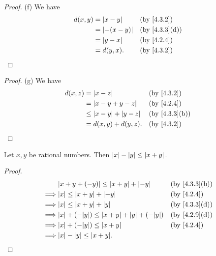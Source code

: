 \begin{proof}{(f)}
  We have
  \begin{align*}
    d(x, y) & = \abs{x - y}    &  & \by{4.3.2}                  \\
            & = \abs{-(x - y)} &  & \text{(by \cref{4.3.3}(d))} \\
            & = \abs{y - x}    &  & \by{4.2.4}                  \\
            & = d(y, x).       &  & \by{4.3.2}
  \end{align*}
\end{proof}

\begin{proof}{(g)}
  We have
  \begin{align*}
    d(x, z) & = \abs{x - z}                  &  & \by{4.3.2}                  \\
            & = \abs{x - y + y - z}          &  & \by{4.2.4}                  \\
            & \leq \abs{x - y} + \abs{y - z} &  & \text{(by \cref{4.3.3}(b))} \\
            & = d(x, y) + d(y, z).           &  & \by{4.3.2}                  \\
  \end{align*}
\end{proof}

\begin{ac}\label{ac:4.3.1}
  Let \(x, y\) be rational numbers.
  Then \(\left\lvert x\right\rvert - \left\lvert y\right\rvert \leq \left\lvert x + y\right\rvert\).
\end{ac}

\begin{proof}
  \begin{align*}
             & \abs{x + y + (-y)} \leq \abs{x + y} + \abs{-y}               &  & \text{(by \cref{4.3.3}(b))} \\
    \implies & \abs{x} \leq \abs{x + y} + \abs{-y}                          &  & \by{4.2.4}                  \\
    \implies & \abs{x} \leq \abs{x + y} + \abs{y}                           &  & \text{(by \cref{4.3.3}(d))} \\
    \implies & \abs{x} + (-\abs{y}) \leq \abs{x + y} + \abs{y} + (-\abs{y}) &  & \text{(by \cref{4.2.9}(d))} \\
    \implies & \abs{x} + (-\abs{y}) \leq \abs{x + y}                        &  & \by{4.2.4}                  \\
    \implies & \abs{x} - \abs{y} \leq \abs{x + y}.
  \end{align*}
\end{proof}

